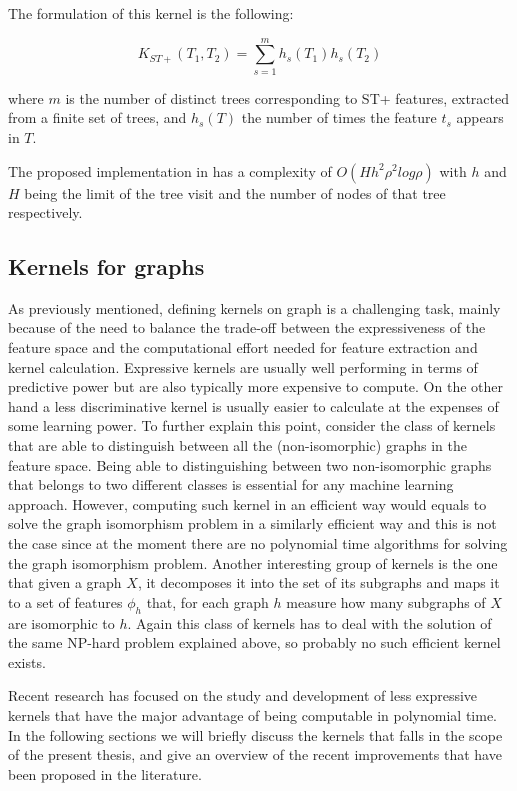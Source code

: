 The formulation of this kernel is the following:

\begin{equation}
    K_{ST+}(T_1, T_2) = \sum_{s=1}^m h_s(T_1)h_s(T_2)
\end{equation}

where $m$ is the number of distinct trees corresponding to ST+ features, extracted
from a finite set of trees, and $h_s(T)$ the number of times the feature $t_s$
appears in $T$.

The proposed implementation in \cite{dasanmartino2015exploiting} has a complexity of
$O(Hh^2\rho^2log\rho)$ with $h$ and $H$ being the limit
of the tree visit and the number of nodes of that tree respectively.

\subsection{Kernels for graphs}
\label{subsec:graphk}

As previously mentioned, defining kernels on graph is a challenging task, mainly
because of the need to balance the trade-off between the expressiveness of the
feature space and the computational effort needed for feature extraction and
kernel calculation.
Expressive kernels are usually well performing in terms of predictive power but
are also typically more expensive to compute.
On the other hand a less discriminative kernel is usually easier to calculate
at the expenses of some learning power.
To further explain this point, consider the class of kernels that are able to
distinguish between all the (non-isomorphic) graphs in the feature space.
Being able to distinguishing between two non-isomorphic graphs that belongs to two
different classes is essential for any machine learning approach.
However, computing such kernel in an efficient way would equals to solve the
graph isomorphism problem in a similarly efficient way and this is not the case
since at the moment there are no polynomial time algorithms for solving the graph isomorphism problem.
Another interesting group of kernels is the one that given a graph $X$, it decomposes
it into the set of its subgraphs and maps it to a set of features $\phi_h$ that, for
each graph $h$ measure how many subgraphs of $X$ are isomorphic to $h$.
Again this class of kernels has to deal with the solution of the same NP-hard
problem explained above, so probably no such efficient kernel exists.

Recent research has focused on the study and development of less expressive
kernels that have the major advantage of being computable in polynomial time.
In the following sections we will briefly discuss the kernels that falls in the
scope of the present thesis, and give an overview of the recent improvements that
have been proposed in the literature.

